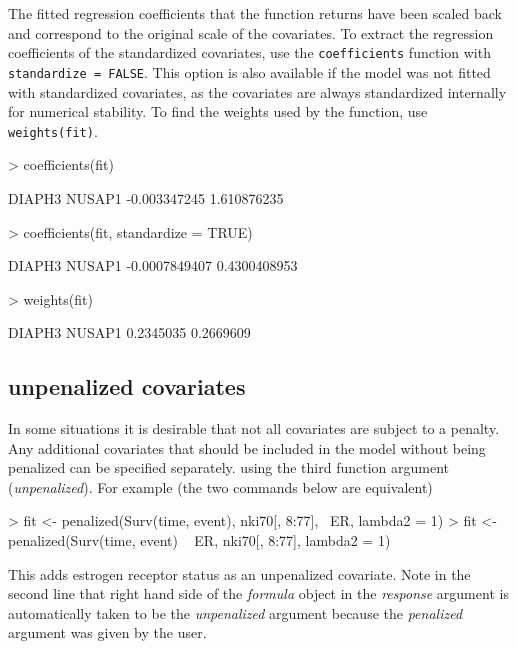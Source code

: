 \documentclass[a4paper]{article}
\newcommand{\Robject}[1]{{\texttt{#1}}}
\newcommand{\Rfunction}[1]{{\texttt{#1}}}
\newcommand{\Rclass}[1]{{\textit{#1}}}
\newcommand{\Rfunarg}[1]{{\textit{#1}}}
\begin{document}
The fitted regression coefficients that the function returns have been scaled back and correspond to the original scale of the covariates. To extract the regression coefficients of the standardized covariates, use the \Rfunction{coefficients} function with \Robject{standardize = FALSE}. This option is also available if the model was not fitted with standardized covariates, as the covariates are always standardized internally for numerical stability. To find the weights used by the function, use \Robject{weights(fit)}.

\begin{Schunk}
\begin{Sinput}
> coefficients(fit)
\end{Sinput}
\begin{Soutput}
      DIAPH3       NUSAP1 
-0.003347245  1.610876235 
\end{Soutput}
\begin{Sinput}
> coefficients(fit, standardize = TRUE)
\end{Sinput}
\begin{Soutput}
       DIAPH3        NUSAP1 
-0.0007849407  0.4300408953 
\end{Soutput}
\begin{Sinput}
> weights(fit)
\end{Sinput}
\begin{Soutput}
   DIAPH3    NUSAP1 
0.2345035 0.2669609 
\end{Soutput}
\end{Schunk}


\subsection{unpenalized covariates}

In some situations it is desirable that not all covariates are subject to a penalty. Any additional covariates that should be included in the model without being penalized can be specified separately. using the third function argument (\Rfunarg{unpenalized}). For example (the two commands below are equivalent)

\begin{Schunk}
\begin{Sinput}
> fit <- penalized(Surv(time, event), nki70[, 8:77], ~ER, lambda2 = 1)
> fit <- penalized(Surv(time, event) ~ ER, nki70[, 8:77], lambda2 = 1)
\end{Sinput}
\end{Schunk}

This adds estrogen receptor status as an unpenalized covariate. Note in the second line that right hand side of the \Rclass{formula} object in the \Rfunarg{response} argument is automatically taken to be the \Rfunarg{unpenalized} argument because the \Rfunarg{penalized} argument was given by the user.
\end{document}
